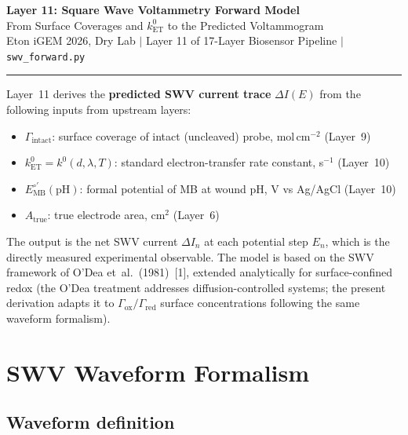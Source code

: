 \documentclass[10pt,a4paper]{article}
\numberwithin{equation}{section}
\newcommand{\kET}{k_{\text{ET}}^{0}}
\newcommand{\cit}[1]{[#1]}
\newcommand{\Eo}{E^{\circ\prime}}
\newcommand{\Gox}{\Gamma_{\text{ox}}}
\newcommand{\Gred}{\Gamma_{\text{red}}}
\newcommand{\Gtot}{\Gamma_{\text{intact}}}
\newcommand{\DI}{\Delta I}
\begin{document}
\begin{center}
{\LARGE\bfseries Layer 11: Square Wave Voltammetry Forward Model}\\[0.4em]
{\large From Surface Coverages and $k_{\text{ET}}^0$ to the Predicted Voltammogram}\\[0.25em]
{\small\color{gray} Eton iGEM 2026, Dry Lab \quad$|$\quad
Layer 11 of 17-Layer Biosensor Pipeline \quad$|$\quad
\texttt{swv\_forward.py}}
\end{center}
\vspace{0.4em}\hrule\vspace{0.7em}

\noindent
Layer~11 derives the \textbf{predicted SWV current trace} $\DI(E)$
from the following inputs from upstream layers:
\begin{itemize}[nosep,leftmargin=*]
  \item $\Gtot$: surface coverage of intact (uncleaved) probe, mol\,cm$^{-2}$ (Layer~9)
  \item $\kET = k^0(d,\lambda,T)$: standard electron-transfer rate constant, s$^{-1}$ (Layer~10)
  \item $\Eo_{\text{MB}}(\text{pH})$: formal potential of MB at wound pH, V vs Ag/AgCl (Layer~10)
  \item $A_{\text{true}}$: true electrode area, cm$^2$ (Layer~6)
\end{itemize}
The output is the net SWV current $\DI_n$ at each potential step $E_n$,
which is the directly measured experimental observable. The model
is based on the SWV framework of O'Dea et~al.~(1981)~\cit{1},
extended analytically for surface-confined redox (the O'Dea treatment
addresses diffusion-controlled systems; the present derivation adapts
it to $\Gox/\Gred$ surface concentrations following the same
waveform formalism).

\section{SWV Waveform Formalism}
\label{sec:waveform}

\subsection{Waveform definition}
\end{document}
